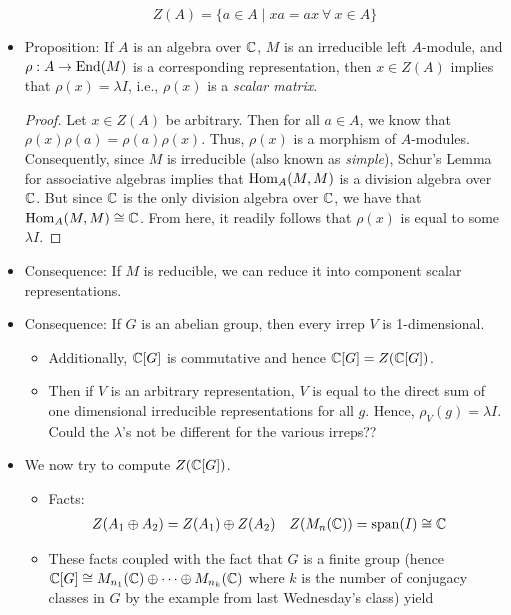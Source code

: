 \documentclass[../notes.tex]{subfiles}
\begin{document}
\begin{itemize}
    \begin{equation*}
        Z(A) = \{a\in A\mid xa=ax\ \forall\ x\in A\}
    \end{equation*}
    \item Proposition: If $A$ is an algebra over $\mathbb{C}$, $M$ is an irreducible left $A$-module, and $\rho:A\to\operatorname{End}(M)$ is a corresponding representation, then $x\in Z(A)$ implies that $\rho(x)=\lambda I$, i.e., $\rho(x)$ is a \emph{scalar matrix}.
    \begin{proof}
        Let $x\in Z(A)$ be arbitrary. Then for all $a\in A$, we know that $\rho(x)\rho(a)=\rho(a)\rho(x)$. Thus, $\rho(x)$ is a morphism of $A$-modules. Consequently, since $M$ is irreducible (also known as \emph{simple}), Schur's Lemma for associative algebras implies that $\operatorname{Hom}_A(M,M)$ is a division algebra over $\mathbb{C}$. But since $\mathbb{C}$ is the only division algebra over $\mathbb{C}$, we have that $\operatorname{Hom}_A(M,M)\cong\mathbb{C}$. From here, it readily follows that $\rho(x)$ is equal to some $\lambda I$.
    \end{proof}
    \item Consequence: If $M$ is reducible, we can reduce it into component scalar representations.
    \item Consequence: If $G$ is an abelian group, then every irrep $V$ is 1-dimensional.
    \begin{itemize}
        \item Additionally, $\mathbb{C}[G]$ is commutative and hence $\mathbb{C}[G]=Z(\mathbb{C}[G])$.
        \item Then if $V$ is an arbitrary representation, $V$ is equal to the direct sum of one dimensional irreducible representations for all $g$. Hence, $\rho_V(g)=\lambda I$. Could the $\lambda$'s not be different for the various irreps??
    \end{itemize}
    \item We now try to compute $Z(\mathbb{C}[G])$.
    \begin{itemize}
        \item Facts:
        \begin{align*}
            Z(A_1\oplus A_2) &= Z(A_1)\oplus Z(A_2)&
            Z(M_n(\mathbb{C})) &= \operatorname{span}(I) \cong \mathbb{C}
        \end{align*}
        \item These facts coupled with the fact that $G$ is a finite group (hence $\mathbb{C}[G]\cong M_{n_1}(\mathbb{C})\oplus\cdots\oplus M_{n_k}(\mathbb{C})$ where $k$ is the number of conjugacy classes in $G$ by the example from last Wednesday's class) yield
        \begin{align*}

\end{align*}
\end{itemize}
\end{itemize}
\end{document}
